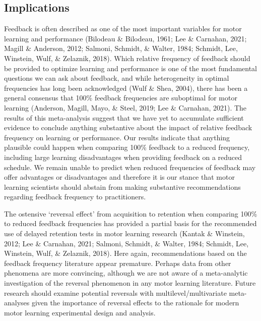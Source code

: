 \documentclass[
  english,
  man,mask,floatsintext]{apa7}
\begin{document}
\hypertarget{implications}{%
\subsection{Implications}\label{implications}}

Feedback is often described as one of the most important variables for motor learning and performance (Bilodeau \& Bilodeau, 1961; Lee \& Carnahan, 2021; Magill \& Anderson, 2012; Salmoni, Schmidt, \& Walter, 1984; Schmidt, Lee, Winstein, Wulf, \& Zelaznik, 2018). Which relative frequency of feedback should be provided to optimize learning and performance is one of the most fundamental questions we can ask about feedback, and while heterogeneity in optimal frequencies has long been acknowledged (Wulf \& Shea, 2004), there has been a general consensus that 100\% feedback frequencies are suboptimal for motor learning (Anderson, Magill, Mayo, \& Steel, 2019; Lee \& Carnahan, 2021). The results of this meta-analysis suggest that we have yet to accumulate sufficient evidence to conclude anything substantive about the impact of relative feedback frequency on learning or performance. Our results indicate that anything plausible could happen when comparing 100\% feedback to a reduced frequency, including large learning disadvantages when providing feedback on a reduced schedule. We remain unable to predict when reduced frequencies of feedback may offer advantages or disadvantages and therefore it is our stance that motor learning scientists should abstain from making substantive recommendations regarding feedback frequency to practitioners.

The ostensive `reversal effect' from acquisition to retention when comparing 100\% to reduced feedback frequencies has provided a partial basis for the recommended use of delayed retention tests in motor learning research (Kantak \& Winstein, 2012; Lee \& Carnahan, 2021; Salmoni, Schmidt, \& Walter, 1984; Schmidt, Lee, Winstein, Wulf, \& Zelaznik, 2018). Here again, recommendations based on the feedback frequency literature appear premature. Perhaps data from other phenomena are more convincing, although we are not aware of a meta-analytic investigation of the reversal phenomenon in any motor learning literature. Future research should examine potential reversals with multilevel/multivariate meta-analyses given the importance of reversal effects to the rationale for modern motor learning experimental design and analysis.
\end{document}
